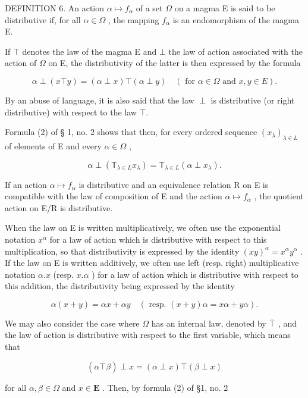 DEFINITION 6. An action \(\alpha \mapsto f_{\alpha}\) of a set \(\Omega\) on a magma E is said to be distributive if, for all \(\alpha \in \Omega\) , the mapping \(f_{\alpha}\) is an endomorphism of the magma E.

If \(\top\) denotes the law of the magma E and \(\bot\) the law of action associated with the action of \(\Omega\) on E, the distributivity of the latter is then expressed by the formula

\[
\alpha \perp (x \top y) = (\alpha \perp x) \top (\alpha \perp y) \quad (\text { for   } \alpha \in \Omega \text {   and   } x, y \in E).\tag{6}
\]

By an abuse of language, it is also said that the law \(\perp\) is distributive (or right distributive) with respect to the law \(\top\).

Formula (2) of § 1, no. 2 shows that then, for every ordered sequence \((x_{\lambda})_{\lambda \in L}\) of elements of E and every \(\alpha \in \Omega\) ,

\[
\alpha \perp \left(\mathsf {T} _ {\lambda \in L} x _ {\lambda}\right) = \mathsf {T} _ {\lambda \in L} (\alpha \perp x _ {\lambda}).\tag{7}
\]

If an action \(\alpha\mapsto f_{\alpha}\) is distributive and an equivalence relation R on E is compatible with the law of composition of E and the action \(\alpha\mapsto f_{\alpha}\) , the quotient action on E/R is distributive.

When the law on E is written multiplicatively, we often use the exponential notation \(x^{\alpha}\) for a law of action which is distributive with respect to this multiplication, so that distributivity is expressed by the identity \((xy)^{\alpha} = x^{\alpha}y^{\alpha}\) . If the law on E is written additively, we often use left (resp. right) multiplicative notation \(\alpha.x\) (resp. \(x.\alpha\) ) for a law of action which is distributive with respect to this addition, the distributivity being expressed by the identity

\[
\alpha (x + y) = \alpha x + \alpha y \quad (\text { resp. } (x + y) \alpha = x \alpha + y \alpha).
\]

We may also consider the case where \(\Omega\) has an internal law, denoted by \(\overline{\top}\) , and the law of action is distributive with respect to the first variable, which means that

\[
(\alpha \overline{\top} \beta) \perp x = (\alpha \perp x) \top (\beta \perp x)\tag{8}
\]

for all \(\alpha, \beta \in \Omega\) and \(x \in \mathbf{E}\) . Then, by formula (2) of §1, no. 2

